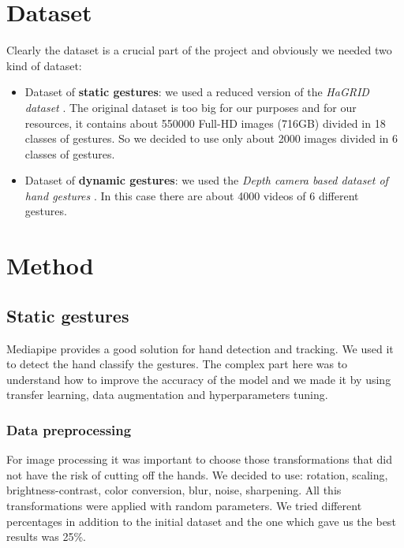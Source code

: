\documentclass[10pt,twocolumn,letterpaper]{article}
\begin{document}
\section{Dataset}
Clearly the dataset is a crucial part of the project and obviously we needed two kind of dataset:
\begin{itemize}
   \item Dataset of \textbf{static gestures}: we used a reduced version of the \textit{HaGRID dataset} \cite{Alexander_2024}. The original dataset is too big for our purposes and for our resources, it contains about 550000 Full-HD images (716GB) divided in 18 classes of gestures. So we decided to use only about 2000 images divided in 6 classes of gestures.
   \item Dataset of \textbf{dynamic gestures}: we used the \textit{Depth camera based dataset of hand gestures} \cite{JEERU2022108659}. In this case there are about 4000 videos of 
   6 different gestures.
\end{itemize}

\section{Method}
\subsection{Static gestures}
Mediapipe provides a good solution for hand detection and tracking. We used it to detect the hand classify the gestures.
The complex part here was to understand how to improve the accuracy of the model and we made it by using transfer learning, data augmentation and hyperparameters tuning.
\subsubsection{Data preprocessing}
For image processing it was important to choose those transformations that did not have the risk of cutting off the hands. We decided to use: rotation, scaling, 
brightness-contrast, color conversion, blur, noise, sharpening. All this transformations were applied with random parameters.
We tried different percentages in addition to the initial dataset and the one which gave us the best results was 25\%.  
\end{document}
